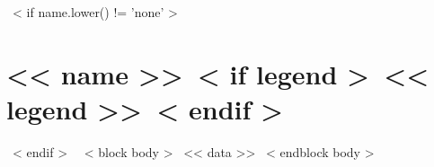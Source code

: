 ~< if name.lower() != 'none' >~
\section{<< name >>~< if legend >~\hfill{\normalsize\normalfont<< legend >>}~< endif >~}
~< endif >~
  ~< block body >~
    << data >>
  ~< endblock body >~
